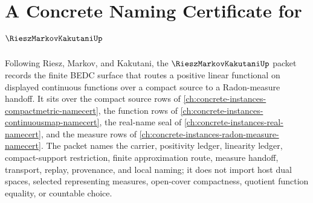 \chapter{A Concrete Naming Certificate for $\RieszMarkovKakutaniUp$}
\label{ch:concrete-instances-riesz-markov-kakutani-namecert}

Following Riesz, Markov, and Kakutani, the $\RieszMarkovKakutaniUp$ packet records the finite BEDC surface that routes a positive linear functional on displayed continuous functions over a compact source to a Radon-measure handoff. It sits over the compact source rows of \autoref{ch:concrete-instances-compactmetric-namecert}, the function rows of \autoref{ch:concrete-instances-continuousmap-namecert}, the real-name seal of \autoref{ch:concrete-instances-real-namecert}, and the measure rows of \autoref{ch:concrete-instances-radon-measure-namecert}. The packet names the carrier, positivity ledger, linearity ledger, compact-support restriction, finite approximation route, measure handoff, transport, replay, provenance, and local naming; it does not import host dual spaces, selected representing measures, open-cover compactness, quotient function equality, or countable choice.

